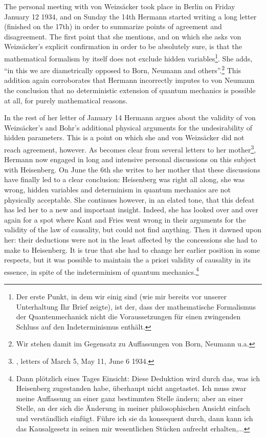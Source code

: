 \documentclass[11pt]{article}
\begin{document}
The personal meeting with von Weizs\"{a}cker took place in Berlin on Friday January 12 1934, and on Sunday the 14th Hermann started writing a long letter (finished on the 17th)  in order to summarize points of agreement and disagreement. The first point that she mentions, and on which she asks von Weizs\"{a}cker's explicit confirmation in order to be absolutely sure, is that the mathematical formalism by itself does not exclude hidden variables\footnote{Der erste Punkt, in dem wir einig sind (wie mir bereits vor unserer Unterhaltung Ihr Brief zeigte), ist der, dass der mathematische Formalismus der Quantenmechanick nicht die Voraussetzungen f\"{u}r einen zwingenden Schluss auf den Indeterminismus enth\"{a}lt.}.  She adds, ``in this we are diametrically opposed to Born, Neumann and others''.\footnote{Wir stehen damit im Gegensatz zu Auffassungen von Born, Neumann u.a.} This addition again corroborates that Hermann incorrectly imputes to von Neumann the conclusion that no deterministic extension of quantum mechanics is possible at all, for purely mathematical reasons.  

In the rest of her letter of  January 14  Hermann argues about the validity of von Weizs\"{a}cker's and Bohr's additional physical arguments for the undesirability of hidden parameters. This is a point on which she and von Weizs\"{a}cker did not reach agreement, however. As becomes clear from several letters to her mother\footnote{\cite{kay}, letters of March 5, May 11, June 6 1934.}, Hermann now engaged in long and intensive personal discussions on this subject with Heisenberg. On June the 6th she writes to her mother that these discussions have finally led to a clear conclusion: Heisenberg was right all along, she was wrong, hidden variables and determinism in quantum mechanics are not physically acceptable. She continues however, in an elated tone, that this defeat has led her to a new and important insight.  Indeed, she has looked over and over again for a spot where Kant and Fries went wrong in their arguments for the validity of the law of causality, but could not find anything. Then it dawned upon her: their deductions were not in the least affected by the concessions she had to make to Heisenberg. It is true that she had to change her earlier position in some respects,  but it was possible to maintain the a priori validity of causality in its essence, in spite of the indeterminism of quantum mechanics.\footnote{Dann pl\"{o}tzlich eines Tages Einsicht: Diese Deduktion wird durch das, was ich Heisenberg zugestanden habe, \"{u}berhaupt nicht angetastet. Ich muss zwar meine Auffassung an einer ganz bestimmten Stelle \"{a}ndern; aber an einer Stelle, an der sich die \"{A}nderung in meiner philosophischen Ansicht einfach und verst\"{a}ndlich einf\"{u}gt. F\"{u}hre ich sie da konsequent durch, dann kann ich das Kausalgesetz in seinen mir wesentlichen St\"{u}cken aufrecht erhalten,... }         
\end{document}
